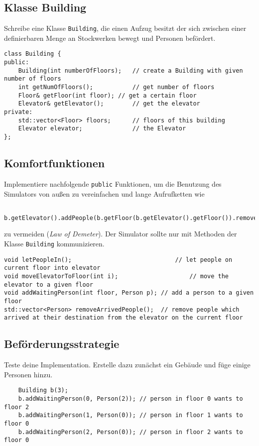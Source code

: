\subsection{Klasse Building}
Schreibe eine Klasse \texttt{Building}, die einen Aufzug besitzt der sich zwischen einer definierbaren Menge an Stockwerken bewegt und Personen befördert.

\begin{lstlisting}
class Building {
public:
	Building(int numberOfFloors);	// create a Building with given number of floors
	int getNumOfFloors();			// get number of floors
	Floor& getFloor(int floor);	// get a certain floor
	Elevator& getElevator();		// get the elevator
private:
	std::vector<Floor> floors;		// floors of this building
	Elevator elevator;				// the Elevator
};
\end{lstlisting}


\subsection{Komfortfunktionen}
Implementiere nachfolgende \texttt{public} Funktionen, um die Benutzung des Simulators von außen zu vereinfachen und lange Aufrufketten wie
\begin{lstlisting}
	b.getElevator().addPeople(b.getFloor(b.getElevator().getFloor()).removeAllPeople());
\end{lstlisting}

zu vermeiden (\emph{Law of Demeter}).
Der Simulator sollte nur mit Methoden der Klasse \texttt{Building} kommunizieren.

\begin{lstlisting}
void letPeopleIn();								// let people on current floor into elevator
void moveElevatorToFloor(int i);					// move the elevator to a given floor
void addWaitingPerson(int floor, Person p);	// add a person to a given floor
std::vector<Person> removeArrivedPeople();	// remove people which arrived at their destination from the elevator on the current floor
\end{lstlisting}

\subsection{Beförderungsstrategie}
Teste deine Implementation.
Erstelle dazu zunächst ein Gebäude und füge einige Personen hinzu.

\begin{lstlisting}
	Building b(3);
	b.addWaitingPerson(0, Person(2)); // person in floor 0 wants to floor 2
	b.addWaitingPerson(1, Person(0)); // person in floor 1 wants to floor 0
	b.addWaitingPerson(2, Person(0)); // person in floor 2 wants to floor 0
\end{lstlisting}

